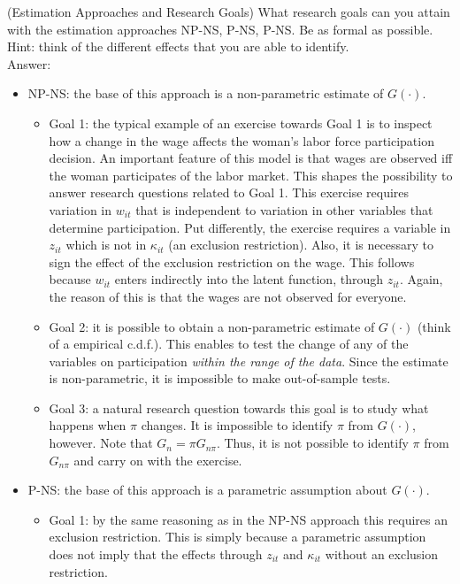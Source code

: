 \begin{exercise} (Estimation Approaches and Research Goals) \label{exercise:approaches}
What research goals can you attain with the estimation approaches NP-NS, P-NS, P-NS. Be as formal as possible. Hint: think of the different effects that you are able to identify.\\
\noindent Answer:\\
\begin{itemize}
\item NP-NS: the base of this approach is a non-parametric estimate of $G(\cdot)$.
\begin{itemize}
\item Goal 1: the typical example of an exercise towards Goal 1 is to inspect how a change in the wage affects the woman's labor force participation decision. An important feature of this model is that wages are observed iff the woman participates of the labor market. This shapes the possibility to answer research questions related to Goal 1. This exercise requires variation in $w_{it}$ that is independent to variation in other variables that determine participation. Put differently, the exercise requires a variable in $z_{it}$ which is not in $\kappa_{it}$ (an exclusion restriction). Also, it is necessary to sign the effect of the exclusion restriction on the wage. This follows because $w_{it}$ enters indirectly into the latent function, through $z_{it}$. Again, the reason of this is that the wages are not observed for everyone.   
\item Goal 2: it is possible to obtain a non-parametric estimate of $G(\cdot)$ (think of a empirical c.d.f.). This enables to test the change of any of the variables on participation \emph{within the range of the data}. Since the estimate is non-parametric, it is impossible to make out-of-sample tests.   
\item Goal 3: a natural research question towards this goal is to study what happens when $\pi$ changes. It is impossible to identify $\pi$ from $G(\cdot)$, however. Note that $G_{n} = \pi G_{n \pi}$. Thus, it is not possible to identify $\pi$ from $G_{n \pi}$ and carry on with the exercise.
\end{itemize} 
\item P-NS: the base of this approach is a parametric assumption about $G(\cdot)$.
\begin{itemize}
\item Goal 1: by the same reasoning as in the NP-NS approach this requires an exclusion restriction. This is simply because a parametric assumption does not imply that the effects through $z_{it}$ and $\kappa_{it}$ without an exclusion restriction. 

\end{itemize}
\end{itemize}
\end{exercise}
